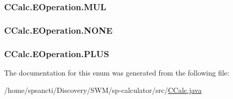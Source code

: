 \subsubsection[{\texorpdfstring{M\+UL}{MUL}}]{\setlength{\rightskip}{0pt plus 5cm}C\+Calc.\+E\+Operation.\+M\+UL}\hypertarget{enum_c_calc_1_1_e_operation_a051966564e9f03115fb805a1960aa836}{}\label{enum_c_calc_1_1_e_operation_a051966564e9f03115fb805a1960aa836}
\subsubsection[{\texorpdfstring{N\+O\+NE}{NONE}}]{\setlength{\rightskip}{0pt plus 5cm}C\+Calc.\+E\+Operation.\+N\+O\+NE}\hypertarget{enum_c_calc_1_1_e_operation_a9aab46d4e883fd9980cf6240d3b12420}{}\label{enum_c_calc_1_1_e_operation_a9aab46d4e883fd9980cf6240d3b12420}
\subsubsection[{\texorpdfstring{P\+L\+US}{PLUS}}]{\setlength{\rightskip}{0pt plus 5cm}C\+Calc.\+E\+Operation.\+P\+L\+US}\hypertarget{enum_c_calc_1_1_e_operation_afc16350b26643685dff75544f58ca765}{}\label{enum_c_calc_1_1_e_operation_afc16350b26643685dff75544f58ca765}


The documentation for this enum was generated from the following file\+:\begin{DoxyCompactItemize}
\item 
/home/spsancti/\+Discovery/\+S\+W\+M/sp-\/calculator/src/\hyperlink{_c_calc_8java}{C\+Calc.\+java}\end{DoxyCompactItemize}
